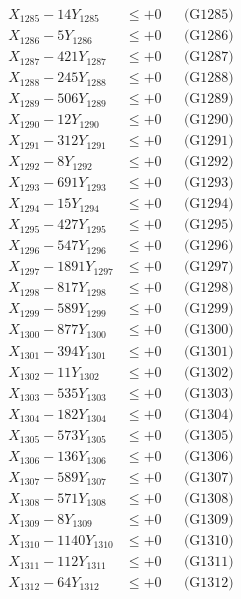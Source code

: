 \documentclass[a4paper,10pt]{article}
\begin{document}
{\begin{align}
X_{1285} - 14Y_{1285} &\leq +0 && \text{(G1285)} \\
X_{1286} - 5Y_{1286} &\leq +0 && \text{(G1286)} \\
X_{1287} - 421Y_{1287} &\leq +0 && \text{(G1287)} \\
X_{1288} - 245Y_{1288} &\leq +0 && \text{(G1288)} \\
X_{1289} - 506Y_{1289} &\leq +0 && \text{(G1289)} \\
X_{1290} - 12Y_{1290} &\leq +0 && \text{(G1290)} \\
\allowbreak
X_{1291} - 312Y_{1291} &\leq +0 && \text{(G1291)} \\
X_{1292} - 8Y_{1292} &\leq +0 && \text{(G1292)} \\
X_{1293} - 691Y_{1293} &\leq +0 && \text{(G1293)} \\
X_{1294} - 15Y_{1294} &\leq +0 && \text{(G1294)} \\
X_{1295} - 427Y_{1295} &\leq +0 && \text{(G1295)} \\
X_{1296} - 547Y_{1296} &\leq +0 && \text{(G1296)} \\
X_{1297} - 1891Y_{1297} &\leq +0 && \text{(G1297)} \\
X_{1298} - 817Y_{1298} &\leq +0 && \text{(G1298)} \\
X_{1299} - 589Y_{1299} &\leq +0 && \text{(G1299)} \\
X_{1300} - 877Y_{1300} &\leq +0 && \text{(G1300)} \\
\allowbreak
X_{1301} - 394Y_{1301} &\leq +0 && \text{(G1301)} \\
X_{1302} - 11Y_{1302} &\leq +0 && \text{(G1302)} \\
X_{1303} - 535Y_{1303} &\leq +0 && \text{(G1303)} \\
X_{1304} - 182Y_{1304} &\leq +0 && \text{(G1304)} \\
X_{1305} - 573Y_{1305} &\leq +0 && \text{(G1305)} \\
X_{1306} - 136Y_{1306} &\leq +0 && \text{(G1306)} \\
X_{1307} - 589Y_{1307} &\leq +0 && \text{(G1307)} \\
X_{1308} - 571Y_{1308} &\leq +0 && \text{(G1308)} \\
X_{1309} - 8Y_{1309} &\leq +0 && \text{(G1309)} \\
X_{1310} - 1140Y_{1310} &\leq +0 && \text{(G1310)} \\
\allowbreak
X_{1311} - 112Y_{1311} &\leq +0 && \text{(G1311)} \\
X_{1312} - 64Y_{1312} &\leq +0 && \text{(G1312)} \\

\end{align}}
\end{document}
